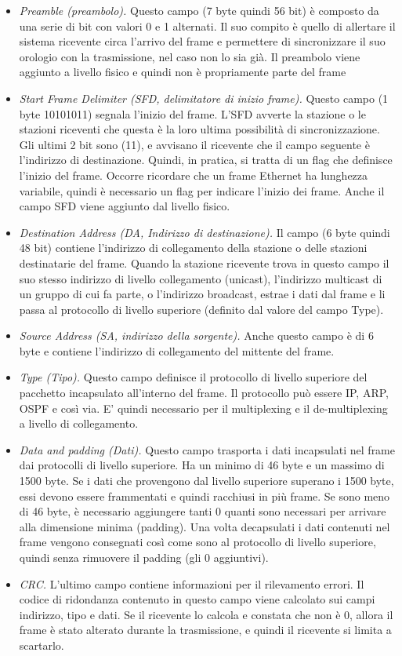 \begin{itemize}
    \item \textit{Preamble (preambolo).} Questo campo (7 byte quindi 56 bit) è composto da una serie di bit con valori 0 e 1 alternati. Il suo compito è quello di allertare il sistema ricevente circa l'arrivo del frame e permettere di sincronizzare il suo orologio con la trasmissione, nel caso non lo sia già. Il preambolo viene aggiunto a livello fisico e quindi non è propriamente parte del frame
    \item \textit{Start Frame Delimiter (SFD, delimitatore di inizio frame).} Questo campo (1 byte 10101011) segnala l'inizio del frame. L'SFD avverte la stazione o le stazioni riceventi che questa è la loro ultima possibilità di sincronizzazione. Gli ultimi 2 bit sono (11), e avvisano il ricevente che il campo seguente è l'indirizzo di destinazione. Quindi, in pratica, si tratta di un flag che definisce l'inizio del frame. Occorre ricordare che un frame Ethernet ha lunghezza variabile, quindi è necessario un flag per indicare l'inizio dei frame. Anche il campo SFD viene aggiunto dal livello fisico.
    \item \textit{Destination Address (DA, Indirizzo di destinazione).} Il campo (6 byte quindi 48 bit) contiene l'indirizzo di collegamento della stazione o delle stazioni destinatarie del frame. Quando la stazione ricevente trova in questo campo il suo stesso indirizzo di livello collegamento (unicast), l'indirizzo multicast di un gruppo di cui fa parte, o l'indirizzo broadcast, estrae i dati dal frame e li passa al protocollo di livello superiore (definito dal valore del campo Type).
    \item \textit{Source Address (SA, indirizzo della sorgente).} Anche questo campo è di 6 byte e contiene l'indirizzo di collegamento del mittente del frame.
    \item \textit{Type (Tipo).} Questo campo definisce il protocollo di livello superiore del pacchetto incapsulato all'interno del frame. Il protocollo può essere IP, ARP, OSPF e così via. E' quindi necessario per il multiplexing e il de-multiplexing a livello di collegamento.
    \item \textit{Data and padding (Dati).} Questo campo trasporta i dati incapsulati nel frame dai protocolli di livello superiore. Ha un minimo di 46 byte e un massimo di 1500 byte. Se i dati che provengono dal livello superiore superano i 1500 byte, essi devono essere frammentati e quindi racchiusi in più frame. Se sono meno di 46 byte, è necessario aggiungere tanti 0 quanti sono necessari per arrivare alla dimensione minima (padding). Una volta decapsulati i dati contenuti nel frame vengono consegnati così come sono al protocollo di livello superiore, quindi senza rimuovere il padding (gli 0 aggiuntivi).
    \item \textit{CRC.} L'ultimo campo contiene informazioni per il rilevamento errori. Il codice di ridondanza contenuto in questo campo viene calcolato sui campi indirizzo, tipo e dati. Se il ricevente lo calcola e constata che non è 0, allora il frame è stato alterato durante la trasmissione, e quindi il ricevente si limita a scartarlo.
\end{itemize}

